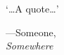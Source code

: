 \begin{RaggedRight}

\vspace*{2.2cm}

`\ldots A quote\ldots'
\begin{flushright}
---Someone,\\
\emph{Somewhere}
\end{flushright}

\end{RaggedRight}